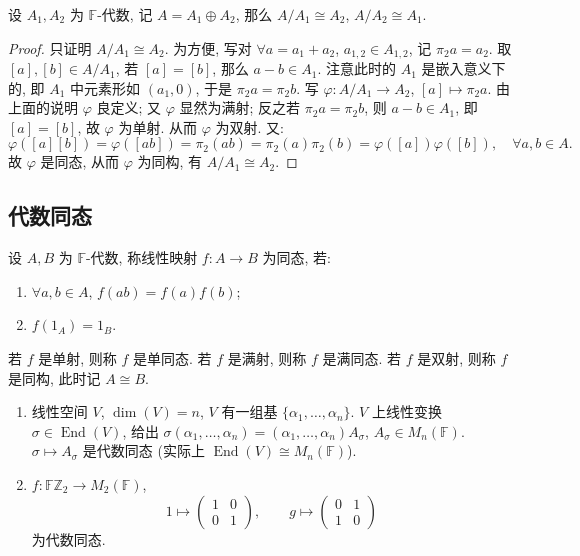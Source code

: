 \begin{example}\label{ex:direct-sum-quotient}
设 $A_1,A_2$ 为 $\mathbb{F}$-代数, 记 $A=A_1\oplus A_2$, 那么 $A/A_1\cong A_2$, $A/A_2\cong A_1$.
\end{example}

\begin{proof}
只证明 $A/A_1\cong A_2$. 为方便, 写对 $\forall a=a_1+a_2$, $a_{1,2}\in A_{1,2}$,
记 $\pi_2a=a_2$. 取 $[a],[b]\in A/A_1$, 若 $[a]=[b]$, 那么 $a-b\in A_1$.
注意此时的 $A_1$ 是嵌入意义下的, 即 $A_1$ 中元素形如 $(a_1,0)$, 于是 $\pi_2a=\pi_2b$.
写 $\varphi\colon A/A_1\to A_2$, $[a]\mapsto\pi_2a$.
由上面的说明 $\varphi$ 良定义; 又 $\varphi$ 显然为满射; 反之若 $\pi_2a=\pi_2b$,
则 $a-b\in A_1$, 即 $[a]=[b]$, 故 $\varphi$ 为单射. 从而 $\varphi$ 为双射.
又:
\[
  \varphi([a][b])=\varphi([ab])=\pi_2(ab)=\pi_2(a)\pi_2(b)=\varphi([a])\varphi([b]),
  \quad\forall a,b\in A .
\]
故 $\varphi$ 是同态, 从而 $\varphi$ 为同构, 有 $A/A_1\cong A_2$.
\end{proof}

\subsection{代数同态}

\begin{definition}[代数同态]\label{def:algebra-hom}
设 $A,B$ 为 $\mathbb{F}$-代数, 称线性映射 $f\colon A\to B$ 为同态, 若:
\begin{enumerate}
  \item $\forall a,b\in A$, $f(ab)=f(a)f(b)$;
  \item $f(1_A)=1_B$.
\end{enumerate}
若 $f$ 是单射, 则称 $f$ 是单同态. 若 $f$ 是满射, 则称 $f$ 是满同态.
若 $f$ 是双射, 则称 $f$ 是同构, 此时记 $A\cong B$.
\end{definition}

\begin{example}\label{ex:endomorphism-matrix}
\mbox{}\par\vspace{-0.2em}
\begin{enumerate}
  \item 线性空间 $V$, $\dim(V)=n$, $V$ 有一组基 $\{\alpha_1,\dots,\alpha_n\}$.
  $V$ 上线性变换 $\sigma\in\operatorname{End}(V)$, 给出
  $\sigma(\alpha_1,\dots,\alpha_n)=(\alpha_1,\dots,\alpha_n)A_\sigma$, $A_\sigma\in M_n(\mathbb{F})$.
  $\sigma\mapsto A_\sigma$ 是代数同态 (实际上 $\operatorname{End}(V)\cong M_n(\mathbb{F})$).
  \item $f\colon \mathbb{F}\mathbb{Z}_2\to M_2(\mathbb{F})$,
  \[
    1\mapsto\begin{pmatrix}1&0\\0&1\end{pmatrix},\qquad
    g\mapsto\begin{pmatrix}0&1\\1&0\end{pmatrix}
  \]
  为代数同态.
\end{enumerate}
\end{example}

